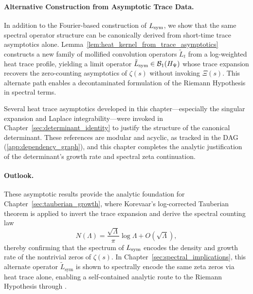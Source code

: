 \paragraph{Alternative Construction from Asymptotic Trace Data.}
In addition to the Fourier-based construction of \( L_{\mathrm{sym}} \), we show that the same spectral operator structure can be canonically derived from short-time trace asymptotics alone. Lemma~\ref{lem:heat_kernel_from_trace_asymptotics} constructs a new family of mollified convolution operators \( \tilde{L}_t \) from a log-weighted heat trace profile, yielding a limit operator \( \tilde{L}_{\mathrm{sym}} \in \mathcal{B}_1(H_{\Psi}) \) whose trace expansion recovers the zero-counting asymptotics of \( \zeta(s) \) without invoking \( \Xi(s) \). This alternate path enables a decontaminated formulation of the Riemann Hypothesis in spectral terms.

\begin{remark}
Several heat trace asymptotics developed in this chapter—especially the singular expansion and Laplace integrability—were invoked in Chapter~\ref{sec:determinant_identity} to justify the structure of the canonical determinant. These references are modular and acyclic, as tracked in the DAG (\cref{app:dependency_graph}), and this chapter completes the analytic justification of the determinant’s growth rate and spectral zeta continuation.
\end{remark}

\paragraph{Outlook.}
These asymptotic results provide the analytic foundation for Chapter~\ref{sec:tauberian_growth}, where Korevaar’s log-corrected Tauberian theorem is applied to invert the trace expansion and derive the spectral counting law
\[
N(\Lambda) = \frac{\sqrt{\Lambda}}{\pi} \log \Lambda + O(\sqrt{\Lambda}),
\]
thereby confirming that the spectrum of \( L_{\mathrm{sym}} \) encodes the density and growth rate of the nontrivial zeros of \( \zeta(s) \). In Chapter~\ref{sec:spectral_implications}, this alternate operator \( \tilde{L}_{\mathrm{sym}} \) is shown to spectrally encode the same zeta zeros via heat trace alone, enabling a self-contained analytic route to the Riemann Hypothesis through .

